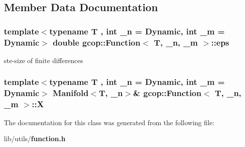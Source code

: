 \subsection{\-Member \-Data \-Documentation}
\subsubsection[{eps}]{\setlength{\rightskip}{0pt plus 5cm}template$<$typename T , int \-\_\-n = \-Dynamic, int \-\_\-m = \-Dynamic$>$ double {\bf gcop\-::\-Function}$<$ \-T, \-\_\-n, \-\_\-m $>$\-::{\bf eps}}\label{classgcop_1_1Function_a29493bbb5a796ed7ba726e19d2c77a85}


ste-\/size of finite differences 

\subsubsection[{\-X}]{\setlength{\rightskip}{0pt plus 5cm}template$<$typename T , int \-\_\-n = \-Dynamic, int \-\_\-m = \-Dynamic$>$ {\bf \-Manifold}$<$\-T, \-\_\-n$>$\& {\bf gcop\-::\-Function}$<$ \-T, \-\_\-n, \-\_\-m $>$\-::{\bf \-X}}\label{classgcop_1_1Function_a0f9c09abb915a0c40deb711f7ca7e80a}


\-The documentation for this class was generated from the following file\-:\begin{DoxyCompactItemize}
\item 
lib/utils/{\bf function.\-h}\end{DoxyCompactItemize}
